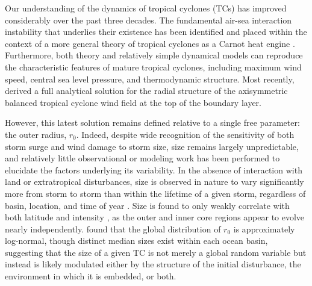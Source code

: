 \documentclass[12pt]{article}
\begin{document}
Our understanding of the dynamics of tropical cyclones (TCs) has improved considerably over the past three decades. The fundamental air-sea interaction instability that underlies their existence has been identified and placed within the context of a more general theory of tropical cyclones as a Carnot heat engine \citep{Emanuel_1986}. Furthermore, both theory and relatively simple dynamical models \citep{Emanuel_1995a, Rotunno_Emanuel_1987} can reproduce the characteristic features of mature tropical cyclones, including maximum wind speed, central sea level pressure, and thermodynamic structure. Most recently, \cite{Emanuel_Rotunno_2011} derived a full analytical solution for the radial structure of the axisymmetric balanced tropical cyclone wind field at the top of the boundary layer.

However, this latest solution remains defined relative to a single free parameter: the outer radius, $r_0$. Indeed, despite wide recognition of the sensitivity of both storm surge \citep{Irish_Resio_Ratcliff_2008} and wind damage \citep{Iman_Johnson_Watson_2005} to storm size, size remains largely unpredictable, and relatively little observational or modeling work has been performed to elucidate the factors underlying its variability. In the absence of interaction with land or extratropical disturbances, size is observed in nature to vary significantly more from storm to storm than within the lifetime of a given storm, regardless of basin, location, and time of year \citep{Merrill_1984, Frank_1977, Chavas_Emanuel_2010, Cheng-Shang_Cheung_Wei-Ting_Elsberry_2010}.  Size is found to only weakly correlate with both latitude and intensity \citep{Merrill_1984, Weatherford_Gray_1988, Chavas_Emanuel_2010}, as the outer and inner core regions appear to evolve nearly independently.  \cite{Chavas_Emanuel_2010} found that the global distribution of $r_0$ is approximately log-normal, though distinct median sizes exist within each ocean basin, suggesting that the size of a given TC is not merely a global random variable but instead is likely modulated either by the structure of the initial disturbance, the environment in which it is embedded, or both.
\end{document}
